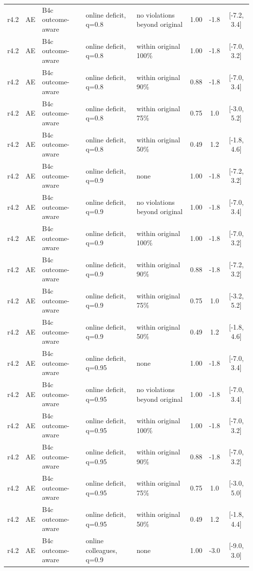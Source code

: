 \documentclass[10pt,onecolumn,letterpaper]{article}
\begin{document}
\begin{longtable}{lllp{4.2cm}p{3.4cm}ccc}
r4.2 & AE & B4c outcome-aware & online deficit, q=0.8 & no violations beyond original & 1.00 & -1.8 & [-7.2, 3.4] \\
r4.2 & AE & B4c outcome-aware & online deficit, q=0.8 & within original 100\% & 1.00 & -1.8 & [-7.0, 3.2] \\
r4.2 & AE & B4c outcome-aware & online deficit, q=0.8 & within original 90\% & 0.88 & -1.8 & [-7.0, 3.4] \\
r4.2 & AE & B4c outcome-aware & online deficit, q=0.8 & within original 75\% & 0.75 & 1.0 & [-3.0, 5.2] \\
r4.2 & AE & B4c outcome-aware & online deficit, q=0.8 & within original 50\% & 0.49 & 1.2 & [-1.8, 4.6] \\
r4.2 & AE & B4c outcome-aware & online deficit, q=0.9 & none & 1.00 & -1.8 & [-7.2, 3.2] \\
r4.2 & AE & B4c outcome-aware & online deficit, q=0.9 & no violations beyond original & 1.00 & -1.8 & [-7.0, 3.4] \\
r4.2 & AE & B4c outcome-aware & online deficit, q=0.9 & within original 100\% & 1.00 & -1.8 & [-7.0, 3.2] \\
r4.2 & AE & B4c outcome-aware & online deficit, q=0.9 & within original 90\% & 0.88 & -1.8 & [-7.2, 3.2] \\
r4.2 & AE & B4c outcome-aware & online deficit, q=0.9 & within original 75\% & 0.75 & 1.0 & [-3.2, 5.2] \\
r4.2 & AE & B4c outcome-aware & online deficit, q=0.9 & within original 50\% & 0.49 & 1.2 & [-1.8, 4.6] \\
r4.2 & AE & B4c outcome-aware & online deficit, q=0.95 & none & 1.00 & -1.8 & [-7.0, 3.4] \\
r4.2 & AE & B4c outcome-aware & online deficit, q=0.95 & no violations beyond original & 1.00 & -1.8 & [-7.0, 3.4] \\
r4.2 & AE & B4c outcome-aware & online deficit, q=0.95 & within original 100\% & 1.00 & -1.8 & [-7.0, 3.2] \\
r4.2 & AE & B4c outcome-aware & online deficit, q=0.95 & within original 90\% & 0.88 & -1.8 & [-7.0, 3.2] \\
r4.2 & AE & B4c outcome-aware & online deficit, q=0.95 & within original 75\% & 0.75 & 1.0 & [-3.0, 5.0] \\
r4.2 & AE & B4c outcome-aware & online deficit, q=0.95 & within original 50\% & 0.49 & 1.2 & [-1.8, 4.4] \\
r4.2 & AE & B4c outcome-aware & online colleagues, q=0.9 & none & 1.00 & -3.0 & [-9.0, 3.0] \\

\end{longtable}
\end{document}
